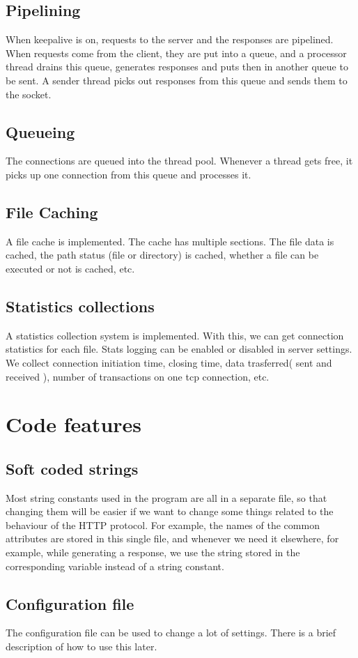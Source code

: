 \documentclass[12pt,a4paper,final]{article}
\begin{document}
\subsection{Pipelining}
When keepalive is on, requests to the server and the responses are pipelined. When requests come from the client, they are put into a queue, and a processor thread drains this queue, generates responses and puts then in another queue to be sent. A sender thread picks out responses from this queue and sends them to the socket. 
\subsection{Queueing}
The connections are queued into the thread pool. Whenever a thread gets free, it picks up one connection from this queue and processes it.
\subsection{File Caching}
A file cache is implemented. The cache has multiple sections. The file data is cached, the path status (file or directory) is cached, whether a file can be executed or not is cached, etc. 
\subsection{Statistics collections}
A statistics collection system is implemented. With this, we can get connection statistics for each file. Stats logging can be enabled or disabled in server settings. We collect connection initiation time, closing time, data trasferred( sent and received ), number of transactions on one tcp connection, etc.
\section{Code features}
\subsection{Soft coded strings}
Most string constants used in the program are all in a separate file, so that changing them will be easier if we want to change some things related to the behaviour of the HTTP protocol. For example, the names of the common attributes are stored in this single file, and whenever we need it elsewhere, for example, while generating a response, we use the string stored in the corresponding variable instead of a string constant. 
\subsection{Configuration file}
The configuration file can be used to change a lot of settings. There is a brief description of how to use this later.
\end{document}
